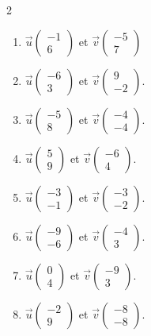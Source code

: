 {\begin{Exercice}
\begin{multicols}{2}
\begin{enumerate}[itemsep=1em]
	\item $\overrightarrow{u}\begin{pmatrix}-1\\6\end{pmatrix}$ et $\overrightarrow{v}\begin{pmatrix}-5\\7\end{pmatrix}$
	\item $\overrightarrow{u}\begin{pmatrix}-6\\3\end{pmatrix}$ et $\overrightarrow{v}\begin{pmatrix}9\\-2\end{pmatrix}$.
	\item $\overrightarrow{u}\begin{pmatrix}-5\\8\end{pmatrix}$ et $\overrightarrow{v}\begin{pmatrix}-4\\-4\end{pmatrix}$.
	\item $\overrightarrow{u}\begin{pmatrix}5\\9\end{pmatrix}$ et $\overrightarrow{v}\begin{pmatrix}-6\\4\end{pmatrix}$.
	\item $\overrightarrow{u}\begin{pmatrix}-3\\-1\end{pmatrix}$ et $\overrightarrow{v}\begin{pmatrix}-3\\-2\end{pmatrix}$.
	\item $\overrightarrow{u}\begin{pmatrix}-9\\-6\end{pmatrix}$ et $\overrightarrow{v}\begin{pmatrix}-4\\3\end{pmatrix}$.
	\item $\overrightarrow{u}\begin{pmatrix}0\\4\end{pmatrix}$ et $\overrightarrow{v}\begin{pmatrix}-9\\3\end{pmatrix}$.
	\item$\overrightarrow{u}\begin{pmatrix}-2\\9\end{pmatrix}$ et $\overrightarrow{v}\begin{pmatrix}-8\\-8\end{pmatrix}$.


\end{enumerate}
\end{multicols}
\end{Exercice}}
